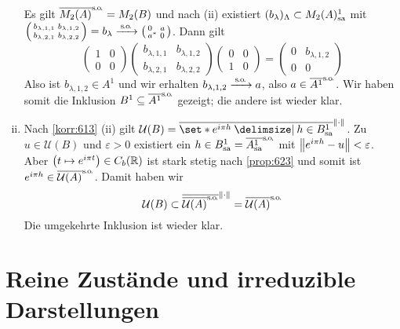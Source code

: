 \begin{beweis}
\begin{enumerate}[(i)]
		 Es gilt $\overline{M_2(A)}^\so=M_2(B)$ und nach (ii) existiert $(b_\lambda)_\Lambda \subset M_2(A)^1_\sa$ mit 
		 \(
		 	\begin{psmallmatrix}
		 		b_{\lambda,1,1} & b_{\lambda,1,2} \\
				b_{\lambda,2,1} & b_{\lambda,2,2}
		 	\end{psmallmatrix}
			=b_\lambda \grenzw{\so} \begin{psmallmatrix*}[l]
				0 & a \\
				a^* & 0
			\end{psmallmatrix*}
		 \).
		 Dann gilt
		 \[
		 	\begin{pmatrix}
		 		1 &0 \\
				0 & 0
		 	\end{pmatrix} 
			\begin{pmatrix}
		 		b_{\lambda,1,1} & b_{\lambda,1,2} \\
				b_{\lambda,2,1} & b_{\lambda,2,2}
			\end{pmatrix}
			\begin{pmatrix}
				0 & 0 \\
				1 & 0
			\end{pmatrix} =
			\begin{pmatrix}
				0 & b_{\lambda,1,2} \\
				0 & 0
			\end{pmatrix}
		 \]
		 Also ist $b_{\lambda,1,2} \in A^1$ und wir erhalten $b_{\lambda,1,2} \grenzw{\so} a$, also $a \in \overline{A^1}^\so$.
		 Wir haben somit die Inklusion $B^1 \subseteq \overline{A^1}^\so$ gezeigt; die andere ist wieder klar.
		 \item Nach \autoref{korr:613} (ii) gilt $\mathcal{U}(B) = \overline{\set*{e^{i \pi h} \given h \in B^1_\sa}}^{\norm*{\cdot}}$.
		 Zu $u \in \mathcal{U}(B)$ und $\varepsilon>0$ existiert ein $h \in B^1_\sa=\overline{A^1_\sa}^\so$ mit $\norm*{e^{i \pi h}-u}<\varepsilon$.
		 Aber $\enbrace*{t \mapsto e^{i \pi t}} \in C_b(\mathbb{R})$ ist stark stetig nach \autoref{prop:623} und somit ist $e^{i \pi h} \in \overline{\mathcal{U}(A)}^\so$.
		 Damit haben wir
		 \[
		 	\mathcal{U}(B) \subset \overline{\overline{\mathcal{U}(A)}^\so}^{\norm*{\cdot}} = \overline{\mathcal{U}(A)}^\so
		 \]
		 Die umgekehrte Inklusion ist wieder klar. \qedhere
	\end{enumerate}
\end{beweis}
\newpage

\section{Reine Zustände und irreduzible Darstellungen} %
\label{sec:7}

